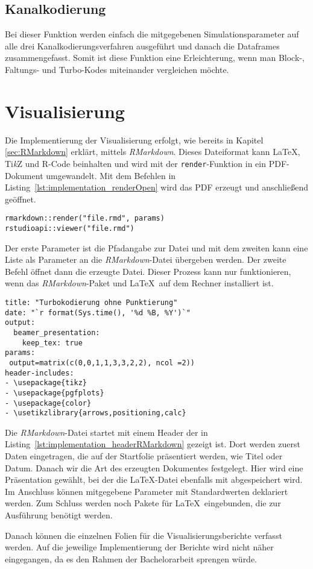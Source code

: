 \FloatBarrier
\subsection{Kanalkodierung}
\label{sec:implementation_channelcoding}
Bei dieser Funktion werden einfach die mitgegebenen Simulationsparameter auf alle drei Kanalkodierungsverfahren ausgeführt und danach die Dataframes zusammengefasst. Somit ist diese Funktion eine Erleichterung, wenn man Block-, Faltungs- und Turbo-Kodes miteinander vergleichen möchte.

\FloatBarrier
\section{Visualisierung}
\label{sec:implementation_visualization}
Die Implementierung der Visualisierung erfolgt, wie bereits in Kapitel \ref{sec:RMarkdown} erklärt, mittels \emph{RMarkdown}. Dieses Dateiformat kann \LaTeX , Ti\textit{k}Z und R-Code beinhalten und wird mit der \texttt{render}-Funktion in ein PDF-Dokument umgewandelt. Mit dem Befehlen in Listing~\ref{lst:implementation_renderOpen} wird das PDF erzeugt und anschließend geöffnet.

\begin{lstlisting}[caption=Erzeugung und Öffnung des PDF-Berichts, label={lst:implementation_renderOpen}, float=!th]
rmarkdown::render("file.rmd", params)
rstudioapi::viewer("file.rmd")
\end{lstlisting}

Der erste Parameter ist die Pfadangabe zur Datei und mit dem zweiten kann eine Liste als Parameter an die \emph{RMarkdown}-Datei übergeben werden. Der zweite Befehl öffnet dann die erzeugte Datei. Dieser Prozess kann nur funktionieren, wenn das \emph{RMarkdown}-Paket und \LaTeX\ auf dem Rechner installiert ist.

\begin{lstlisting}[caption=Header der \emph{RMardown}-Datei, label={lst:implementation_headerRMarkdown}, float=!th]
title: "Turbokodierung ohne Punktierung"
date: "`r format(Sys.time(), '%d %B, %Y')`"
output: 
  beamer_presentation:
    keep_tex: true
params:
 output=matrix(c(0,0,1,1,3,3,2,2), ncol =2))
header-includes:
- \usepackage{tikz}
- \usepackage{pgfplots}
- \usepackage{color}
- \usetikzlibrary{arrows,positioning,calc}
\end{lstlisting}

Die \emph{RMarkdown}-Datei startet mit einem Header der in Listing~\ref{lst:implementation_headerRMarkdown} gezeigt ist. Dort werden zuerst Daten eingetragen, die auf der Startfolie präsentiert werden, wie Titel oder Datum. Danach wir die Art des erzeugten Dokumentes festgelegt. Hier wird eine Präsentation gewählt, bei der die \LaTeX -Datei ebenfalls mit abgespeichert wird. Im Anschluss können mitgegebene Parameter mit Standardwerten deklariert werden. Zum Schluss werden noch Pakete für \LaTeX\ eingebunden, die zur Ausführung benötigt werden.

Danach können die einzelnen Folien für die Visualisierungsberichte verfasst werden. Auf die jeweilige Implementierung der Berichte wird nicht näher eingegangen, da es den Rahmen der Bachelorarbeit sprengen würde. 


